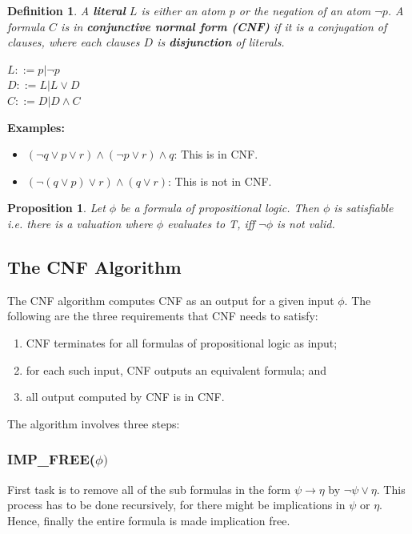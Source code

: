 \documentclass{report}
\newtheorem{definition}{Definition}[chapter]
\newtheorem{proposition}{Proposition}[section]
\begin{document}
\begin{definition}
    A \textbf{literal} $L$ is either an atom $p$ or the negation of an atom $\neg p$.
    A formula \textbf{$C$} is in \textbf{conjunctive normal form (CNF)} if it is a conjugation of clauses, where each clauses \textbf{$D$} is \textbf{disjunction} of literals.\\
    \begin{center}
        $L ::= p|\neg p$\\
        $D ::= L|L \vee D$\\
        $C ::= D|D \wedge C$
    \end{center}
    \end{definition}
\textbf{Examples:}
\begin{itemize}
    \item $(\neg q \vee p \vee r) \wedge (\neg p \vee r) \wedge q$: This is in CNF.
    \item $(\neg (q \vee p) \vee r) \wedge (q \vee r)$: This is not in CNF.
\end{itemize}
\begin{proposition}
    Let $\phi$ be a formula of propositional logic. Then $\phi$ is satisfiable i.e. there is a valuation where $\phi$ evaluates to T, iff $\neg \phi$ is not valid. 
\end{proposition}
\subsection{The CNF Algorithm}
The CNF algorithm computes CNF as an output for a given input $\phi$. The following are the three requirements that CNF needs to satisfy:
\begin{enumerate}
    \item CNF terminates for all formulas of propositional logic as input;
    \item for each such input, CNF outputs an equivalent formula; and
    \item all output computed by CNF is in CNF.
\end{enumerate}
The algorithm involves three steps:
\subsubsection{IMP\_FREE($\phi)$}
First task is to remove all of the sub formulas in the form $\psi \to \eta$ by $\neg \psi \vee \eta$. This process has to be done recursively, for there might be implications in $\psi$ or $\eta$. Hence, finally the entire formula is made implication free.
\end{document}
